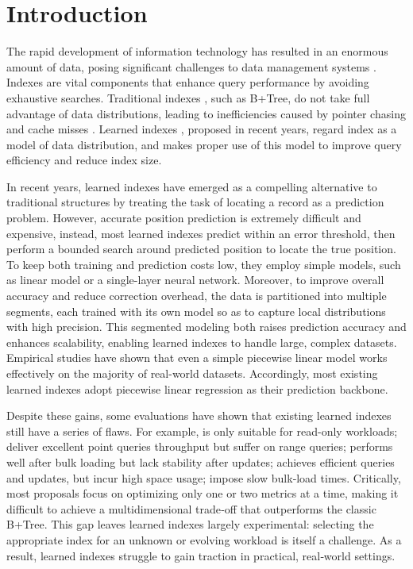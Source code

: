 \section{Introduction}
\label{sec:intro}
The rapid development of information technology has resulted in an enormous amount of data, posing significant challenges to data management systems \cite{bigdata16}. Indexes are vital components that enhance query performance by avoiding exhaustive searches. Traditional indexes \cite{btree06, btree11, bwtree13, dynamichash98, hash16, lsmtree96, lsmtree17, remix21, adaptive18, adaptive22}, such as B+Tree, do not take full advantage of data distributions, leading to inefficiencies caused by pointer chasing and cache misses \cite{learned23}. Learned indexes \cite{case18}, proposed in recent years, regard index as a model of data distribution, and makes proper use of this model to improve query efficiency and reduce index size.

In recent years, learned indexes have emerged as a compelling alternative to traditional structures by treating the task of locating a record as a prediction problem. However, accurate position prediction is extremely difficult and expensive, instead, most learned indexes predict within an error threshold, then perform a bounded search around predicted position to locate the true position. To keep both training and prediction costs low, they employ simple models, such as linear model or a single-layer neural network. Moreover, to improve overall accuracy and reduce correction overhead, the data is partitioned into multiple segments, each trained with its own model so as to capture local distributions with high precision. This segmented modeling both raises prediction accuracy and enhances scalability, enabling learned indexes to handle large, complex datasets. Empirical studies \cite{sosd20} have shown that even a simple piecewise linear model works effectively on the majority of real-world datasets. Accordingly, most existing learned indexes \cite{pgm20, radixspline20, fiting-tree19, alex20, madex20, coax23, swix24, disklearned24} adopt piecewise linear regression as their prediction backbone.

Despite these gains, some evaluations \cite{sosd20, micro22, gre22, learned23} have shown that existing learned indexes still have a series of flaws. For example, \cite{case18, plex21, towards21} is only suitable for read-only workloads; \cite{xindex20, lipp21, finedex21, chameleon24} deliver excellent point queries throughput but suffer on range queries; \cite{pgm20} performs well after bulk loading but lack stability after updates; \cite{lipp21} achieves efficient queries and updates, but incur high space usage; \cite{alex20, swix24} impose slow bulk‐load times. Critically, most proposals focus on optimizing only one or two metrics at a time, making it difficult to achieve a multidimensional trade‑off that outperforms the classic B+Tree. This gap leaves learned indexes largely experimental: selecting the appropriate index for an unknown or evolving workload is itself a challenge. As a result, learned indexes struggle to gain traction in practical, real‑world settings.


